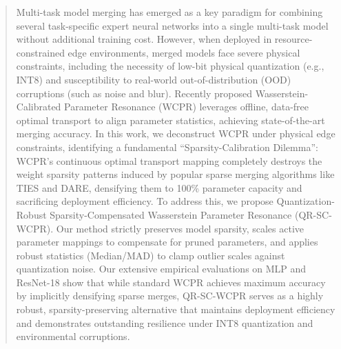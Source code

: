 \documentclass{article}
\theoremstyle{plain}
\theoremstyle{definition}
\theoremstyle{remark}
\begin{document}

\printAffiliationsAndNotice{}

\begin{abstract}
  Multi-task model merging has emerged as a key paradigm for combining several task-specific expert neural networks into a single multi-task model without additional training cost. However, when deployed in resource-constrained edge environments, merged models face severe physical constraints, including the necessity of low-bit physical quantization (e.g., INT8) and susceptibility to real-world out-of-distribution (OOD) corruptions (such as noise and blur). Recently proposed Wasserstein-Calibrated Parameter Resonance (WCPR) leverages offline, data-free optimal transport to align parameter statistics, achieving state-of-the-art merging accuracy. In this work, we deconstruct WCPR under physical edge constraints, identifying a fundamental ``Sparsity-Calibration Dilemma'': WCPR's continuous optimal transport mapping completely destroys the weight sparsity patterns induced by popular sparse merging algorithms like TIES and DARE, densifying them to 100\% parameter capacity and sacrificing deployment efficiency. To address this, we propose Quantization-Robust Sparsity-Compensated Wasserstein Parameter Resonance (QR-SC-WCPR). Our method strictly preserves model sparsity, scales active parameter mappings to compensate for pruned parameters, and applies robust statistics (Median/MAD) to clamp outlier scales against quantization noise. Our extensive empirical evaluations on MLP and ResNet-18 show that while standard WCPR achieves maximum accuracy by implicitly densifying sparse merges, QR-SC-WCPR serves as a highly robust, sparsity-preserving alternative that maintains deployment efficiency and demonstrates outstanding resilience under INT8 quantization and environmental corruptions.
\end{abstract}
\end{document}
